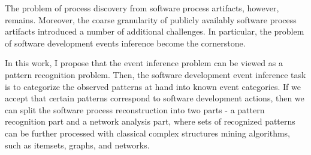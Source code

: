 The problem of process discovery from software process artifacts, however, remains. Moreover, the coarse
granularity of publicly availably software process artifacts introduced a number of additional challenges. 
In particular, the problem of software development events inference become the cornerstone. 

In this work, I propose that the event inference problem can be viewed as a pattern recognition problem.
Then, the software development event inference task is to categorize the observed patterns at hand into known
event categories. If we accept that certain patterns correspond to software development actions, then
we can split the software process reconstruction into two parts - a pattern recognition part and a network analysis part,
where sets of recognized patterns can be further processed with classical complex structures mining algorithms,
such as itemsets, graphs, and networks.





